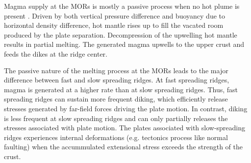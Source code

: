 %

Magma supply at the MORs is mostly a passive process when no hot plume is present \citep{Fowler2004}. Driven by both vertical pressure difference and buoyancy due to horizontal density difference, hot mantle rises up to fill the vacated room produced by the plate separation. Decompression of the upwelling hot mantle results in partial melting. The generated magma upwells to the upper crust and feeds the dikes at the ridge center. %

The passive nature of the melting process at the MORs leads to the major difference between fast and slow spreading ridges. At fast spreading ridges, magma is generated at a higher rate than at slow spreading ridges. Thus, fast spreading ridges can sustain more frequent diking, which efficiently release stresses generated by far-field forces driving the plate motion. In contrast, diking is less frequent at slow spreading ridges and can only partially releases the stresses associated with plate motion. The plates associated with slow-spreading ridges experiences internal deformations (e.g. tectonics process like normal faulting) when the accummulated extensional stress exceeds the strength of the crust.


